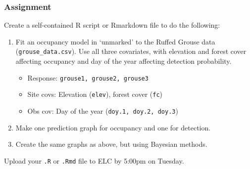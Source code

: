 \documentclass[color=usenames,dvipsnames]{beamer}\usepackage[]{graphicx}\usepackage[]{xcolor}
\begin{document}
\begin{frame}
  \frametitle{Assignment}
  \footnotesize
  Create a self-contained R script or Rmarkdown file
  to do the following:
  \vfill
  \begin{enumerate}
    \footnotesize
    \item Fit an occupancy model in `unmarked' to the Ruffed Grouse
      data ({\tt grouse\_data.csv}). Use all three covariates, with
      elevation and forest cover affecting occupancy and day of the
      year affecting detection probability.
      \begin{itemize}
        \footnotesize
        \item Response: \texttt{grouse1, grouse2, grouse3}
        \item Site covs: Elevation (\texttt{elev}), forest cover ({\tt fc})
        \item Obs cov: Day of the year (\texttt{doy.1, doy.2, doy.3})
      \end{itemize}
    \item Make one prediction graph for occupancy and one for
      detection.  
    \item Create the same graphs as above, but using Bayesian methods.
    \end{enumerate}
    \vfill
    Upload your {\tt .R} or {\tt .Rmd} file to ELC by 5:00pm on Tuesday. 
\end{frame}
\end{document}

